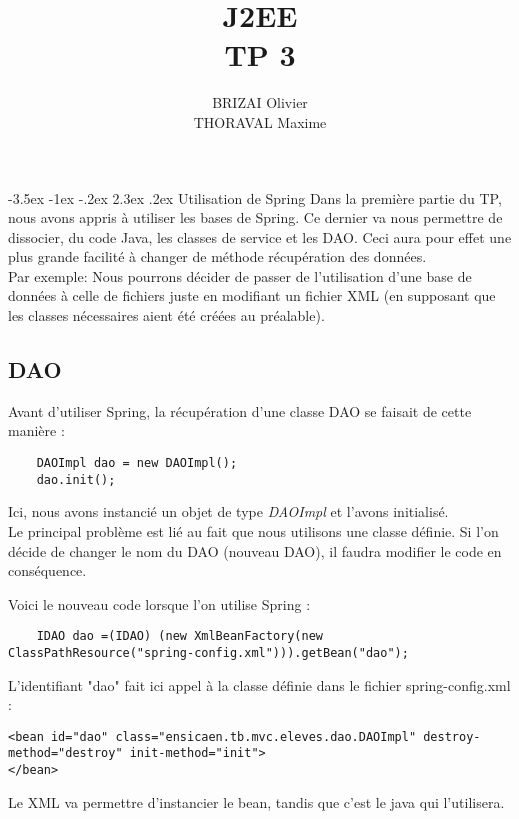 \documentclass[a4paper,12pt]{article}
\makeatletter
\renewcommand\section{\@startsection {section}{1}{\z@}%
                           {-3.5ex \@plus -1ex \@minus -.2ex}%
                           {2.3ex \@plus.2ex}%
                           {\normalfont\Large\bfseries}}
\makeatother
\begin{document}
\newpage
\title{J2EE\\TP 3}
\date{}
\author{BRIZAI Olivier\\THORAVAL Maxime}
\maketitle


\section{Utilisation de Spring}
Dans la première partie du TP, nous avons appris à utiliser les bases de Spring. Ce dernier va nous permettre de dissocier, du code Java, 
les classes de service et les DAO. Ceci aura pour effet une plus grande facilité à changer de méthode récupération des données.\\
Par exemple: Nous pourrons décider de passer de l'utilisation d'une base de données à celle de fichiers juste en modifiant un fichier XML 
(en supposant que les classes nécessaires aient été créées au préalable).

\subsection{DAO}
Avant d'utiliser Spring, la récupération d'une classe DAO se faisait de cette manière :
\begin{lstlisting}
	DAOImpl dao = new DAOImpl();
	dao.init();
\end{lstlisting}
Ici, nous avons instancié un objet de type \textit{DAOImpl} et l'avons initialisé.\\
Le principal problème est lié au fait que nous utilisons une classe définie. Si l'on décide de changer le nom du DAO (nouveau DAO), il faudra modifier le code en conséquence.

Voici le nouveau code lorsque l'on utilise Spring :
\begin{lstlisting}
	IDAO dao =(IDAO) (new XmlBeanFactory(new ClassPathResource("spring-config.xml"))).getBean("dao");
\end{lstlisting}

L'identifiant "dao" fait ici appel à la classe définie dans le fichier spring-config.xml :

\begin{lstlisting}
<bean id="dao" class="ensicaen.tb.mvc.eleves.dao.DAOImpl" destroy-method="destroy" init-method="init">
</bean>
\end{lstlisting}

Le XML va permettre d'instancier le bean, tandis que c'est le java qui l'utilisera.
\end{document}
